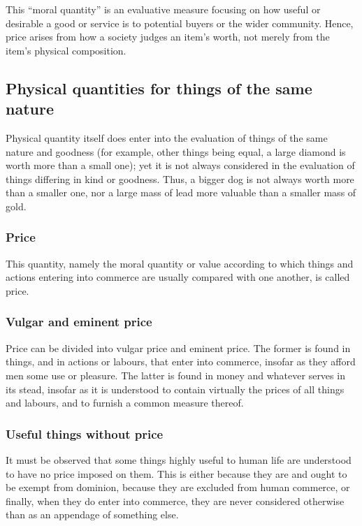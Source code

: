             This “moral quantity” is an evaluative measure focusing on how useful or desirable a good or service is to potential buyers or the wider community. Hence, price arises from how a society judges an item’s worth, not merely from the item’s physical composition.

    \subsection{Physical quantities for things of the same nature}

        Physical quantity itself does enter into the evaluation of things of the same nature and goodness (for example, other things being equal, a large diamond is worth more than a small one); yet it is not always considered in the evaluation of things differing in kind or goodness. Thus, a bigger dog is not always worth more than a smaller one, nor a large mass of lead more valuable than a smaller mass of gold.

        \subsubsection{Price}

            \begin{definition}[Price]
                This quantity, namely the moral quantity or value according to which things and actions entering into commerce are usually compared with one another, is called price.
            \end{definition}

        \subsubsection{Vulgar and eminent price}

            Price can be divided into vulgar price and eminent price. The former is found in things, and in actions or labours, that enter into commerce, insofar as they afford men some use or pleasure. The latter is found in money and whatever serves in its stead, insofar as it is understood to contain virtually the prices of all things and labours, and to furnish a common measure thereof.

        \subsubsection{Useful things without price}

            It must be observed that some things highly useful to human life are understood to have no price imposed on them. This is either because they are and ought to be exempt from dominion, because they are excluded from human commerce, or finally, when they do enter into commerce, they are never considered otherwise than as an appendage of something else.

